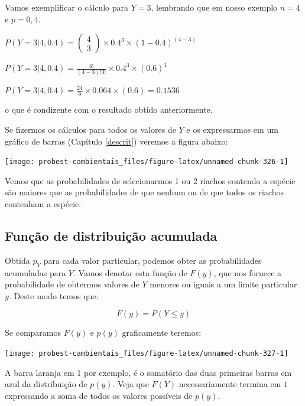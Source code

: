 \documentclass[
]{book}
\begin{document}
Vamos exemplificar o cálculo para \(Y = 3\), lembrando que em nosso exemplo \(n = 4\) e \(p = 0,4\).

\(P(Y = 3|4,0.4) = \left (\begin{array}{c} 4 \\ 3 \end{array}\right) \times 0.4^3 \times (1-0.4)^{(4-3)}\)

\(P(Y = 3|4,0.4) = \frac{4!}{(4-3)!3!} \times 0.4^3 \times (0.6)^{1}\)

\(P(Y = 3|4,0.4) = \frac{24}{6} \times 0.064 \times (0.6) = 0.1536\)

o que é condizente com o resultado obtido anteriormente.

Se fizermos os cálculos para todos os valores de \(Y\) e os expressarmos em um gráfico de barras (Capítulo \ref{descrit}) veremos a figura abaixo:

\begin{center}\texttt{[image: probest-cambientais\_files/figure-latex/unnamed-chunk-326-1]} \end{center}

Vemos que as probabilidades de selecionarmos 1 ou 2 riachos contendo a espécie são maiores que as probabilidades de que nenhum ou de que todos os riachos contenham a espécie.

\hypertarget{funuxe7uxe3o-de-distribuiuxe7uxe3o-acumulada}{%
\subsection*{Função de distribuição acumulada}\label{funuxe7uxe3o-de-distribuiuxe7uxe3o-acumulada}}

Obtida \(p_Y\) para cada valor particular, podemos obter as probabilidades acumuladas para \(Y\). Vamos denotar esta função de \(F(y)\), que nos fornece a probabilidade de obtermos valores de \(Y\) menores ou iguais a um limite particular \(y\). Deste modo temos que:

\[F(y) = P(Y \le y)\]

Se comparamos \(F(y)\) e \(p(y)\) graficamente teremos:

\begin{center}\texttt{[image: probest-cambientais\_files/figure-latex/unnamed-chunk-327-1]} \end{center}

A barra laranja em 1 por exemplo, é o somatório das duas primeiras barras em azul da distribuição de \(p(y)\). Veja que \(F(Y)\) necessariamente termina em \(1\) expressando a soma de todos os valores possíveis de \(p(y)\).
\end{document}
